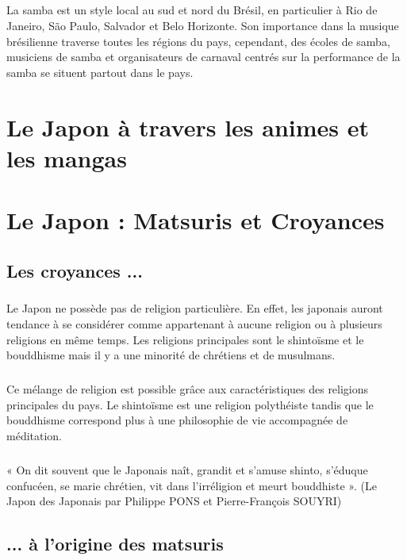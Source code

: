 \paragraph{}
La	samba	est	un	style	local	au	sud	et	nord	du	Brésil,	en	particulier	à Rio	de	Janeiro, São	Paulo,	Salvador	et	Belo	Horizonte.	Son	importance dans	la	musique	brésilienne	traverse	toutes	les	régions	du	pays,	cependant, des	écoles	de	samba,	musiciens	de samba	et	organisateurs	de	carnaval centrés	sur	la	performance	de	la	samba	se situent	partout	dans	le	pays.

\chapter{Le Japon à travers les animes et les mangas}

\chapter{Le Japon : Matsuris et Croyances}
\section{Les croyances ...}
\paragraph{}
Le Japon ne possède pas de religion particulière. En effet, les japonais auront tendance à se considérer comme appartenant à aucune religion ou à plusieurs religions en même temps. Les religions principales sont le shintoïsme et le bouddhisme mais il y a une minorité de chrétiens et de musulmans. 
\paragraph{}
Ce mélange de religion est possible grâce aux caractéristiques des religions principales du pays. Le shintoïsme est une religion polythéiste tandis que le bouddhisme correspond plus à une philosophie de vie accompagnée de méditation.
\paragraph{}
« On dit souvent que le Japonais naît, grandit et s’amuse shinto, s’éduque confucéen, se marie chrétien, vit dans l’irréligion et meurt bouddhiste ». (Le Japon des Japonais par Philippe PONS et Pierre-François SOUYRI)

\section{... à l'origine des matsuris}
